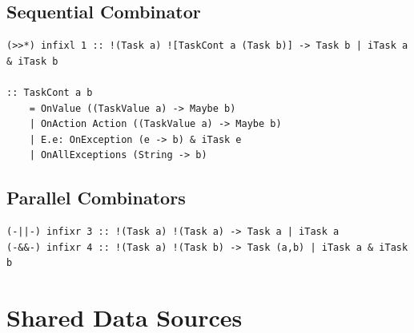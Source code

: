 \subsection{Sequential Combinator}
\begin{lstlisting}[caption=Sequential Combinators,label=seq_comb,captionpos=b]
(>>*) infixl 1 :: !(Task a) ![TaskCont a (Task b)] -> Task b | iTask a & iTask b

:: TaskCont a b                               
	= OnValue ((TaskValue a) -> Maybe b)         
	| OnAction Action ((TaskValue a) -> Maybe b) 
	| E.e: OnException (e -> b) & iTask e        
	| OnAllExceptions (String -> b)    
\end{lstlisting}

\subsection{Parallel Combinators}

\begin{lstlisting}[caption=Parallel Combinators,label=par_comb,captionpos=b]
(-||-) infixr 3 :: !(Task a) !(Task a) -> Task a | iTask a
(-&&-) infixr 4 :: !(Task a) !(Task b) -> Task (a,b) | iTask a & iTask b
\end{lstlisting}


\section{Shared Data Sources}
